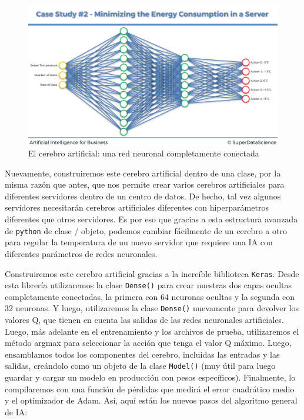 \documentclass[
]{book}
\begin{document}
\begin{figure}
\centering
\includegraphics{Images/Brain.png}
\caption{El cerebro artificial: una red neuronal completamente conectada}
\end{figure}

Nuevamente, construiremos este cerebro artificial dentro de una clase, por la misma razón que antes, que nos permite crear varios cerebros artificiales para diferentes servidores dentro de un centro de datos. De hecho, tal vez algunos servidores necesitarán cerebros artificiales diferentes con hiperparámetros diferentes que otros servidores. Es por eso que gracias a esta estructura avanzada de \texttt{python} de clase / objeto, podemos cambiar fácilmente de un cerebro a otro para regular la temperatura de un nuevo servidor que requiere una IA con diferentes parámetros de redes neuronales.

Construiremos este cerebro artificial gracias a la increíble biblioteca \texttt{Keras}. Desde esta librería utilizaremos la clase \texttt{Dense()} para crear nuestras dos capas ocultas completamente conectadas, la primera con 64 neuronas ocultas y la segunda con 32 neuronas. Y luego, utilizaremos la clase \texttt{Dense()} nuevamente para devolver los valores Q, que tienen en cuenta las salidas de las redes neuronales artificiales. Luego, más adelante en el entrenamiento y los archivos de prueba, utilizaremos el método argmax para seleccionar la acción que tenga el valor Q máximo. Luego, ensamblamos todos los componentes del cerebro, incluidas las entradas y las salidas, creándolo como un objeto de la clase \texttt{Model()} (muy útil para luego guardar y cargar un modelo en producción con pesos específicos). Finalmente, lo compilaremos con una función de pérdidas que medirá el error cuadrático medio y el optimizador de Adam. Así, aquí están los nuevos pasos del algoritmo general de IA:
\end{document}
